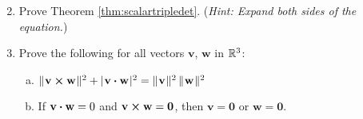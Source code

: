 \begin{enumerate}[\bfseries 1.]
\begin{multicols}{2}
 \end{multicols}
 \item Prove Theorem \ref{thm:scalartripledet}. (\emph{Hint: Expand both sides of the equation.})
 \item Prove the following for all vectors $\mathbf{v}$, $\mathbf{w}$ in $\mathbb{R}^{3}$:
  \begin{enumerate}[(a)]
   \item $\lVert\mspace{1mu}\mathbf{v} \bm{\times} \mathbf{w}\mspace{1mu}\rVert^2 + \lvert\mspace{1mu}\mathbf{v} \bm{\cdot} \mathbf{w}\mspace{1mu}\rvert^2 =
    \lVert\mspace{1mu}\mathbf{v}\mspace{1mu}\rVert^2 \, \lVert\mspace{1mu}\mathbf{w}\mspace{1mu}\rVert^2$
   \item If $\mathbf{v} \bm{\cdot} \mathbf{w} = 0$ and $\mathbf{v} \bm{\times} \mathbf{w} = \mathbf{0}$, then
    $\mathbf{v} = \mathbf{0}$ or $\mathbf{w} = \mathbf{0}$.
  \end{enumerate}


\end{enumerate}
